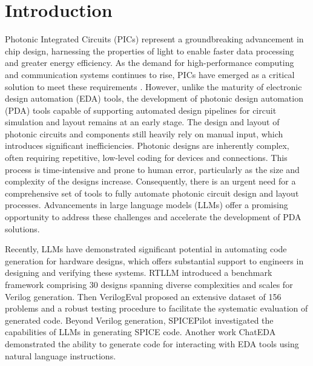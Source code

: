 \section{Introduction}
\label{sec:intro}
Photonic Integrated Circuits (PICs) represent a groundbreaking advancement in chip design, harnessing the properties of light to enable faster data processing and greater energy efficiency. 
As the demand for high-performance computing and communication systems continues to rise, PICs have emerged as a critical solution to meet these requirements \cite{sun2015single,kitayama2019novel,lu2024empowering,xu2024large}. 
However, unlike the maturity of electronic design automation (EDA) tools, the development of photonic design automation (PDA) tools capable of supporting automated design pipelines for circuit simulation and layout remains at an early stage.
The design and layout of photonic circuits and components still heavily rely on manual input, which introduces significant inefficiencies. 
Photonic designs are inherently complex, often requiring repetitive, low-level coding for devices and connections. 
This process is time-intensive and prone to human error, particularly as the size and complexity of the designs increase.
Consequently, there is an urgent need for a comprehensive set of tools to fully automate photonic circuit design and layout processes. 
Advancements in large language models (LLMs) \cite{team2023gemini,TheC3,achiam2023gpt} offer a promising opportunity to address these challenges and accelerate the development of PDA solutions.

Recently, LLMs have demonstrated significant potential in automating code generation for hardware designs, which offers substantial support to engineers in designing and verifying these systems. 
RTLLM \cite{lu2024rtllm} introduced a benchmark framework comprising 30 designs spanning diverse complexities and scales for Verilog generation. 
Then VerilogEval \cite{liu2023verilogeval} proposed an extensive dataset of 156 problems and a robust testing procedure to facilitate the systematic evaluation of generated code. 
Beyond Verilog generation, SPICEPilot \cite{vungarala2024spicepilot} investigated the capabilities of LLMs in generating SPICE code. 
Another work ChatEDA \cite{wu2024chateda} demonstrated the ability to generate code for interacting with EDA tools using natural language instructions. 

